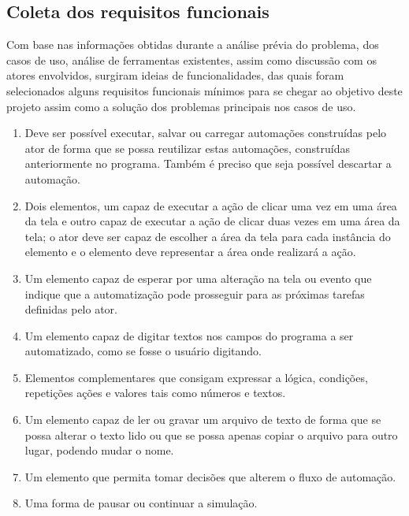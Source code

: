 \documentclass[tg]{mdtufsm}
\begin{document}
            \subsection{Coleta dos requisitos funcionais}

                Com base nas informações obtidas durante a análise prévia do problema, dos casos de uso, análise de ferramentas existentes, assim como discussão com os atores envolvidos, surgiram ideias de funcionalidades, das quais foram selecionados alguns requisitos funcionais mínimos para se chegar ao objetivo deste projeto assim como a solução dos problemas principais nos casos de uso.

                \begin{enumerate}

            		\item Deve ser possível executar, salvar ou carregar automações construídas pelo ator de forma que se possa reutilizar estas automações, construídas anteriormente no programa. Também é preciso que seja possível descartar a automação.

            		\item Dois elementos, um capaz de executar a ação de clicar uma vez em uma área da tela e outro capaz de executar a ação de clicar duas vezes em uma área da tela; o ator deve ser capaz de escolher a área da tela para cada instância do elemento e o elemento deve representar a área onde realizará a ação.

            		\item Um elemento capaz de esperar por uma alteração na tela ou evento que indique que a automatização pode prosseguir para as próximas tarefas definidas pelo ator.

                   \item Um elemento capaz de digitar textos nos campos do programa a ser automatizado, como se fosse o usuário digitando.

                   \item Elementos complementares que consigam expressar a lógica, condições, repetições ações e valores tais como números e textos.

                   \item Um elemento capaz de ler ou gravar um arquivo de texto de forma que se possa alterar o texto lido ou que se possa apenas copiar o arquivo para outro lugar, podendo mudar o nome.

                   \item Um elemento que permita tomar decisões que alterem o fluxo de automação.

                   \item Uma forma de pausar ou continuar a simulação.

            	\end{enumerate}
\end{document}
